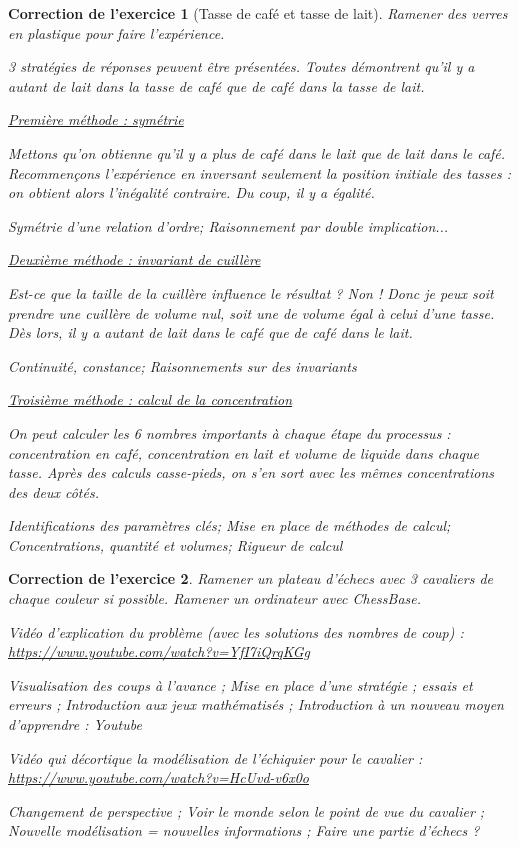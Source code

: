 \documentclass[12pt]{article}
\theoremstyle{break}
\newtheorem{cor}{Correction de l'exercice}
\begin{document}
\begin{cor}[Tasse de café et tasse de lait]
\textit{Ramener des verres en plastique pour faire l'expérience.}

3 stratégies de réponses peuvent être présentées. Toutes démontrent qu'il y a autant de lait dans la tasse de café que de café dans la tasse de lait.
\newline \newline


\underline{Première méthode : symétrie}

Mettons qu'on obtienne qu'il y a plus de café dans le lait que de lait dans le café. Recommençons l'expérience en inversant seulement la position initiale des tasses : on obtient alors l'inégalité contraire. Du coup, il y a égalité.

\textit{Symétrie d'une relation d'ordre; Raisonnement par double implication...}
\newline

\underline{Deuxième méthode : invariant de cuillère}

Est-ce que la taille de la cuillère influence le résultat ? Non ! Donc je peux soit prendre une cuillère de volume nul, soit une de volume égal à celui d'une tasse. Dès lors, il y a autant de lait dans le café que de café dans le lait.

\textit{Continuité, constance; Raisonnements sur des invariants}
\newline

\underline{Troisième méthode : calcul de la concentration}

On peut calculer les 6 nombres importants à chaque étape du processus : concentration en café, concentration en lait et volume de liquide dans chaque tasse. Après des calculs casse-pieds, on s'en sort avec les mêmes concentrations des deux côtés.

\textit{Identifications des paramètres clés; Mise en place de méthodes de calcul; Concentrations, quantité et volumes; Rigueur de calcul}
\end{cor}


\begin{cor}
\textit{Ramener un plateau d'échecs avec 3 cavaliers de chaque couleur si possible. Ramener un ordinateur avec ChessBase.}

Vidéo d'explication du problème (avec les solutions des nombres de coup) : \url{https://www.youtube.com/watch?v=YfI7iQrqKGg}

\textit{Visualisation des coups à l'avance ; Mise en place d'une stratégie ; essais et erreurs ; Introduction aux jeux mathématisés ; Introduction à un nouveau moyen d'apprendre : Youtube}
\newline

Vidéo qui décortique la modélisation de l'échiquier pour le cavalier : \url{https://www.youtube.com/watch?v=HcUvd-v6x0o}

\textit{Changement de perspective ; Voir le monde selon le point de vue du cavalier ; Nouvelle modélisation = nouvelles informations ; Faire une partie d'échecs ?}
\end{cor}
\end{document}
